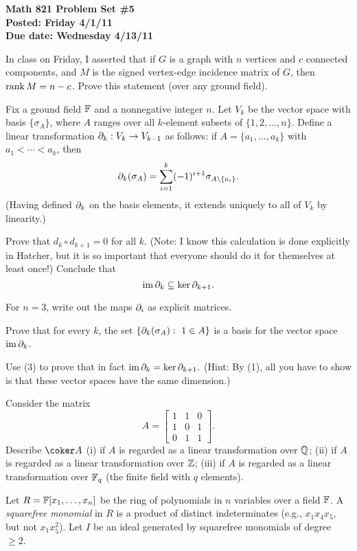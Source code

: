
\usepackage{youngtab}

\thispagestyle{empty}
{\bf Math 821 Problem Set \#5\\
Posted: Friday 4/1/11\\
Due date: Wednesday 4/13/11}

\prob In class on Friday, I asserted that if $G$ is a graph with
$n$ vertices and $c$ connected components, and $M$ is the signed
vertex-edge incidence matrix of $G$, then $\operatorname{rank} M=n-c$.  Prove
this statement (over any ground field).

\prob Fix a ground field $\mathbb{F}$ and a nonnegative integer $n$.
Let $V_k$ be the vector space with basis $\{\sigma_A\}$, where
$A$ ranges over all $k$-element subsets of $\{1,2,\dots,n\}$.
Define a linear transformation $\partial_k:V_k\to V_{k-1}$ as follows:
if $A=\{a_1,\dots,a_k\}$ with $a_1<\cdots<a_k$, then
$$\partial_k(\sigma_A)=\sum_{i=1}^k(-1)^{i+1}\sigma_{A\setminus\{a_i\}}.$$
(Having defined $\partial_k$ on the basis elements, it extends
uniquely to all of $V_k$ by linearity.)

\probpart Prove that $d_k\circ d_{k+1}=0$ for all $k$.  (Note: I know this
calculation is done explicitly in Hatcher,
but it is so important that everyone should do it for themselves at least once!)
Conclude that
$$\operatorname{im}\partial_k\subseteq\ker\partial_{k+1}.$$

\probpart For $n=3$, write out the maps $\partial_i$ as explicit
matrices.

\probpart Prove that for every $k$, the set
$\{\partial_k(\sigma_A):\ 1\in A\}$
is a basis for the vector space $\operatorname{im}\partial_k$.

\probpart Use (3) to prove that in fact
$\operatorname{im}\partial_k=\ker\partial_{k+1}.$
(Hint: By (1), all you have to show is that these vector spaces
have the same dimension.)

\prob Consider the matrix
$$A=\begin{bmatrix} 1&1&0\\1&0&1\\0&1&1\end{bmatrix}.$$
Describe $\coker A$
(i) if $A$ is regarded as a linear transformation over $\mathbb{Q}$;
(ii) if $A$ is regarded as a linear transformation over $\mathbb{Z}$;
(iii) if $A$ is regarded as a linear transformation over $\mathbb{F}_q$
(the finite field with $q$ elements).

\prob Let $R=\mathbb{F}[x_1,\dots,x_n]$ be the ring of polynomials in $n$ 
variables over a field $\mathbb{F}$. A \emph{squarefree monomial} in $R$ is a 
product of distinct indeterminates (e.g., $x_1x_4x_5$, but not 
$x_1x_5^2$). Let $I$ be an ideal generated by squarefree monomials of 
degree $\geq 2$.

